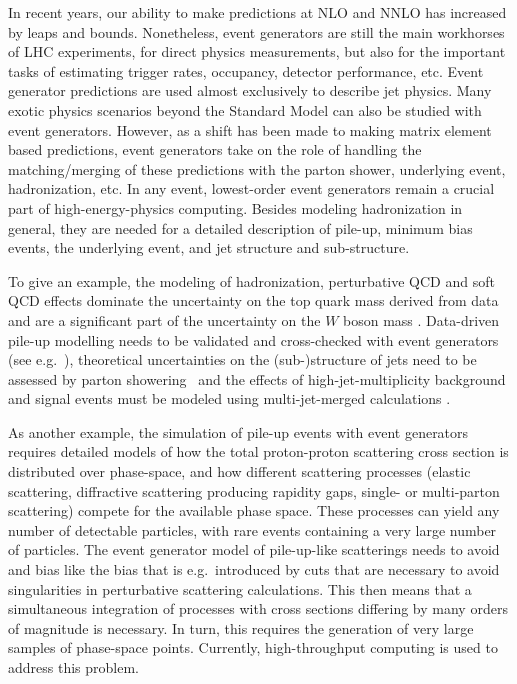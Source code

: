 \documentclass{article}
\begin{document}
In recent years, our ability to make predictions at NLO and NNLO has
increased by leaps and bounds.   Nonetheless, event generators are
still the main workhorses of LHC experiments, for direct physics
measurements, but also for the important tasks of
estimating trigger rates, occupancy, detector performance, etc.
Event generator predictions are used almost exclusively to describe
jet physics.    Many exotic physics scenarios beyond the Standard
Model can also be studied with event generators.
However, as a shift has been made to making matrix element based
predictions, event generators take on the role of handling 
the matching/merging of these predictions with the parton shower,
underlying event, hadronization, etc. In any event, lowest-order 
event generators remain a crucial part of high-energy-physics
computing.   Besides modeling hadronization in general, they are
needed for a detailed description of pile-up, minimum bias events,
the underlying event, and jet structure and sub-structure.

To give an example, the modeling of hadronization, perturbative QCD
and soft QCD effects dominate the uncertainty on the top quark mass derived
from data \cite{Khachatryan:2015hba} and are a significant part of
the uncertainty on the $W$ boson mass \cite{Aaboud:2017svj}.
Data-driven pile-up modelling needs to be validated and cross-checked 
with event generators (see e.g.~\cite{TheATLAScollaboration:2013pia}), 
theoretical uncertainties on the (sub-)structure of jets need to be 
assessed by parton showering~\cite{Bellm:2016rhh,Mrenna:2016sih,Bothmann:2016nao} and 
the effects of high-jet-multiplicity background and signal events 
must be modeled using multi-jet-merged calculations \cite{Catani:2001cc,Lonnblad:2001iq,Krauss:2002up,Mrenna:2003if,Mangano:2006rw,
  Alwall:2007fs,Hoeche:2009rj,Hamilton:2010wh,Hoeche:2012yf,Platzer:2012bs,
  Lonnblad:2012ix,Lonnblad:2012ng,Frederix:2012ps}. 

As another example, the simulation of pile-up events with event generators requires detailed models
of how the total proton-proton scattering cross section is distributed over
phase-space, and how different scattering processes (elastic scattering, 
diffractive scattering producing rapidity gaps, single- or multi-parton 
scattering) compete for the available phase space. These processes can
yield any number of detectable particles, with rare events containing 
a very large number of particles. The event generator model of pile-up-like
scatterings needs to avoid and bias like the bias that is e.g.\ introduced 
by cuts that are necessary to avoid singularities in perturbative
scattering calculations. This then means that a simultaneous integration of
processes with cross sections differing by many orders of magnitude is
necessary. In turn, this requires the generation of very large samples of
phase-space points. Currently, high-throughput computing is used to address this
problem. 
\end{document}
